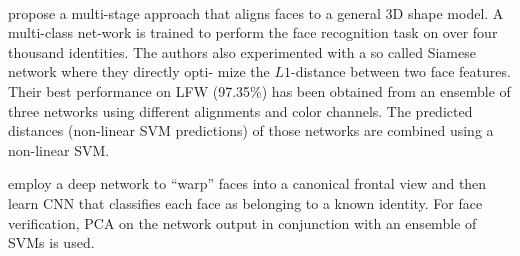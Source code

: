 \\
\par
{} propose a multi-stage approach that aligns faces to a general 3D shape model. A multi-class net-work is trained to perform the face recognition task on over four thousand identities. The authors also experimented with a so called Siamese network where they directly opti-
mize the $L1$-distance between two face features. Their best performance on LFW (97.35\%) has been obtained from an ensemble of three networks using different alignments and color channels. The predicted distances (non-linear SVM predictions) of those networks are combined using a non-linear SVM.
\\
\par
{} employ a deep network  to “warp” faces into a canonical frontal view and then learn CNN that classifies each face as belonging to a known identity. For face verification, PCA on the network output in conjunction with an ensemble of SVMs is used.
